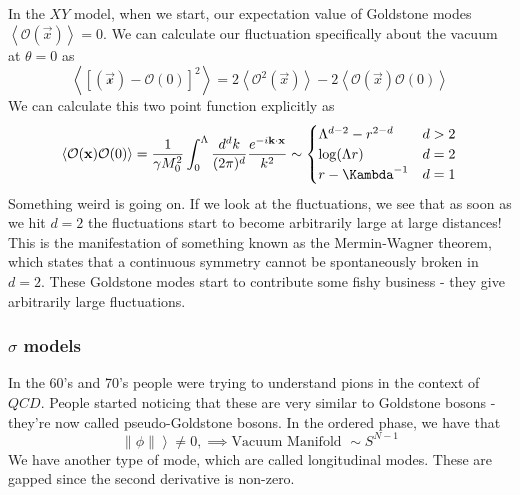 In the $ X Y $ model, when we start, our expectation value of 
Goldstone modes $ \left< \mathcal{ O } ( \vec{x} )  \right>  = 0$. 
We can calculate our fluctuation specifically about the vacuum at $ \theta = 0 $ 
as 
\[
	\left< \left[  \mathcal{ ( \vec{x} ) }  - \mathcal{ O } ( 0 )  \right]  ^ 2  \right> 
	= 2 \left< \mathcal{ O } ^ 2 ( \vec{x} )  \right> - 2 \left< \mathcal{ O } ( \vec{x} ) \mathcal{ O } ( 0 )  \right>
\] 
We can calculate this two point function explicitly as 
\[
	\left< \mathcal{ O } ( \vec{x} ) \mathcal{ O } ( 0 )  \right> 
	= \frac{1}{\gamma M _ 0 ^ 2 } \int _ 0 ^{ \Lambda } \frac{d ^ d k }{ ( 2 \pi ) ^ d } \frac{ e ^{ - i \vec{k} \cdot  \vec{x}}}{k ^ 2}
	\sim \begin{cases}
		\Lambda ^{ d - 2 } - r ^{ 2 - d } & d > 2 \\
		\log ( \Lambda r ) & d =2 \\
		r - \Kambda ^{ - 1 } & d = 1 
	\end{cases}
\] Something weird is going on. If we look at the fluctuations, we see that 
as soon as we hit $ d = 2 $ the fluctuations start to become 
arbitrarily large at large distances! 
This is the manifestation of something known as the Mermin-Wagner theorem, 
which states that a continuous symmetry cannot be 
spontaneously broken in $ d = 2  $. These Goldstone modes 
start to contribute some fishy business - they 
give arbitrarily large fluctuations. 

\subsubsection{$ \sigma $ models} 
In the 60's and 70's people were trying to understand pions in the context of $QCD$. 
People started noticing that these are very similar 
to Goldstone bosons - they're now called pseudo-Goldstone bosons. 
In the ordered phase, we have that 
\[
 \left \| \phi \|  \right> \neq 0, \implies \text{Vacuum Manifold } \sim S^{ N - 1} 
\] We have another type 
of mode, which are called longitudinal modes. These 
are gapped since the second derivative is non-zero. 

